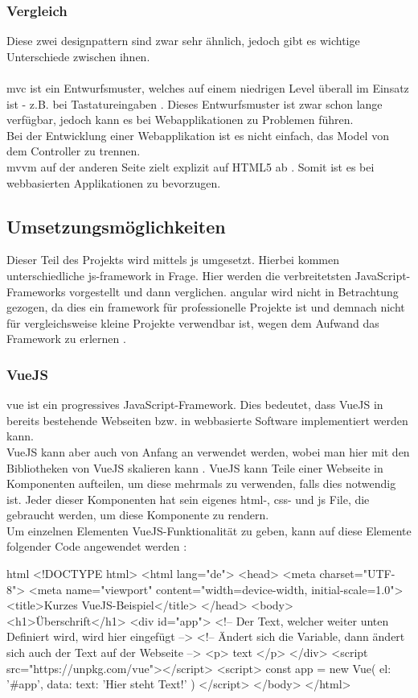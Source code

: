 \subsubsection{Vergleich}
Diese zwei \Gls{designpattern} sind zwar sehr ähnlich, jedoch gibt es wichtige Unterschiede zwischen ihnen.\\\\
\Gls{mvc} ist ein Entwurfsmuster, welches auf einem niedrigen Level überall im Einsatz ist - z.B. bei Tastatureingaben \cite{mvc}. Dieses Entwurfsmuster ist zwar schon lange verfügbar, jedoch kann es bei Webapplikationen zu Problemen führen.\\
Bei der Entwicklung einer Webapplikation ist es nicht einfach, das Model von dem Controller zu trennen.\\
\Gls{mvvm} auf der anderen Seite zielt explizit auf HTML5 ab \cite{mvvm_vue}. Somit ist es bei webbasierten Applikationen zu bevorzugen.
\newpage
\subsection{Umsetzungsmöglichkeiten}
Dieser Teil des Projekts wird mittels \Gls{js} umgesetzt. Hierbei kommen unterschiedliche \Gls{js}-\Gls{framework} in Frage. Hier werden die verbreitetsten JavaScript-Frameworks vorgestellt und dann verglichen. \Gls{angular} wird nicht in Betrachtung gezogen, da dies ein \Gls{framework} für professionelle Projekte ist und demnach nicht für vergleichsweise kleine Projekte verwendbar ist, wegen dem Aufwand das Framework zu erlernen \cite{angular_ex}.
\subsubsection{VueJS}
\gls{vue} ist ein progressives JavaScript-Framework. Dies bedeutet, dass VueJS in bereits bestehende Webseiten bzw. in webbasierte Software implementiert werden kann.\\
VueJS kann aber auch von Anfang an verwendet werden, wobei man hier mit den Bibliotheken von VueJS skalieren kann \cite{vuedoc}. VueJS kann Teile einer Webseite in Komponenten aufteilen, um diese mehrmals zu verwenden, falls dies notwendig ist. Jeder dieser Komponenten hat sein eigenes \Gls{html}-, \Gls{css}- und \Gls{js} File, die gebraucht werden, um diese Komponente zu rendern.\\
Um einzelnen Elementen VueJS-Funktionalität zu geben, kann auf diese Elemente folgender Code angewendet werden \cite{vuedoc}:
\begin{code}{html}
	<!DOCTYPE html>
	<html lang="de">
		<head>
			<meta charset="UTF-8">
			<meta name="viewport" content="width=device-width, initial-scale=1.0">
			<title>Kurzes VueJS-Beispiel</title>
		</head>
		<body>
			<h1>Überschrift</h1>
			<div id="app">
				<!-- Der Text, welcher weiter unten Definiert wird, wird hier eingefügt -->
				<!-- Ändert sich die Variable, dann ändert sich auch der Text auf der Webseite -->
				<p> {{ text }} </p>
			</div>
			<script src="https://unpkg.com/vue"></script>
			<script>
				const app = new Vue({
					el: '#app',
					data: {
						text: 'Hier steht Text!'
					}
				})
			</script>
		</body>
	</html>
\end{code}
~\\
